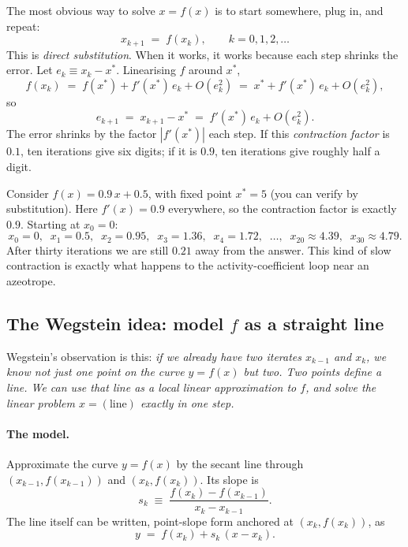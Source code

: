 \documentclass[11pt,a4paper]{article}
\begin{document}
The most obvious way to solve $x = f(x)$ is to start somewhere,
plug in, and repeat:
\begin{equation}
   x_{k+1} \;=\; f(x_k),
   \qquad k = 0, 1, 2, \dots
   \label{eq:direct-sub}
\end{equation}
This is \emph{direct substitution}.  When it works, it works because
each step shrinks the error.  Let $e_k \equiv x_k - x^{\!*}$.
Linearising $f$ around $x^{\!*}$,
\[
   f(x_k) \;=\; f(x^{\!*}) + f'(x^{\!*})\,e_k + O(e_k^2)
            \;=\; x^{\!*} + f'(x^{\!*})\,e_k + O(e_k^2),
\]
so
\begin{equation}
   e_{k+1} \;=\; x_{k+1} - x^{\!*} \;=\; f'(x^{\!*})\,e_k + O(e_k^2).
\end{equation}
The error shrinks by the factor $|f'(x^{\!*})|$ each step.  If this
\emph{contraction factor} is $0.1$, ten iterations give six digits;
if it is $0.9$, ten iterations give roughly half a digit.

\begin{example}
Consider $f(x) = 0.9\,x + 0.5$, with fixed point $x^{\!*} = 5$ (you can
verify by substitution).  Here $f'(x) = 0.9$ everywhere, so the
contraction factor is exactly $0.9$.  Starting at $x_0 = 0$:
\[
   x_0 = 0,\;\; x_1 = 0.5,\;\; x_2 = 0.95,\;\; x_3 = 1.36,\;\;
   x_4 = 1.72,\;\; \ldots,\;\; x_{20} \approx 4.39,\;\; x_{30} \approx 4.79.
\]
After thirty iterations we are still $0.21$ away from the answer.
This kind of slow contraction is exactly what happens to the
activity-coefficient loop near an azeotrope.
\end{example}

\subsection{The Wegstein idea: model $f$ as a straight line}

Wegstein's observation \cite{Wegstein} is this: \emph{if we already
have two iterates $x_{k-1}$ and $x_k$, we know not just one point on
the curve $y = f(x)$ but \emph{two}.  Two points define a line.  We
can use that line as a local linear approximation to $f$, and solve
the linear problem $x = (\text{line})$ exactly in one step.}

\paragraph{The model.}  Approximate the curve $y = f(x)$ by the
secant line through $(x_{k-1}, f(x_{k-1}))$ and $(x_k, f(x_k))$.
Its slope is
\begin{equation}
   s_k \;\equiv\; \frac{f(x_k) - f(x_{k-1})}{x_k - x_{k-1}}.
   \label{eq:wegstein-slope}
\end{equation}
The line itself can be written, point-slope form anchored at
$(x_k, f(x_k))$, as
\[
   y \;=\; f(x_k) + s_k\,(x - x_k).
\]
\end{document}
